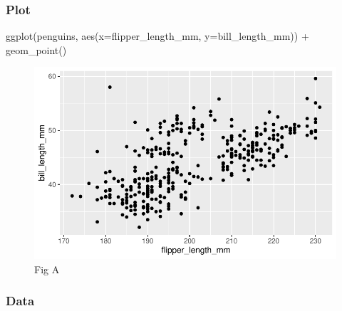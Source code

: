 \documentclass[
  letterpaper,
  DIV=11,
  numbers=noendperiod]{scrreprt}
\newenvironment{Shaded}{\begin{snugshade}}{\end{snugshade}}
\newcommand{\AttributeTok}[1]{\textcolor[rgb]{0.40,0.45,0.13}{#1}}
\newcommand{\FunctionTok}[1]{\textcolor[rgb]{0.28,0.35,0.67}{#1}}
\newcommand{\NormalTok}[1]{\textcolor[rgb]{0.00,0.23,0.31}{#1}}
\newcommand{\SpecialCharTok}[1]{\textcolor[rgb]{0.37,0.37,0.37}{#1}}
\begin{document}
\begin{tcolorbox}[enhanced jigsaw, breakable, colback=white, bottomrule=.15mm, leftrule=.75mm, colframe=quarto-callout-note-color-frame, arc=.35mm, rightrule=.15mm, toprule=.15mm, left=2mm, opacityback=0]

\hypertarget{plot}{%
\subsubsection*{Plot}\label{plot}}

\begin{Shaded}
\begin{Highlighting}[]
\FunctionTok{ggplot}\NormalTok{(penguins, }\FunctionTok{aes}\NormalTok{(}\AttributeTok{x=}\NormalTok{flipper\_length\_mm, }\AttributeTok{y=}\NormalTok{bill\_length\_mm)) }\SpecialCharTok{+}
  \FunctionTok{geom\_point}\NormalTok{()}
\end{Highlighting}
\end{Shaded}

\begin{figure}[H]

{\centering \includegraphics{03-content_files/figure-pdf/unnamed-chunk-4-1.pdf}

}

\caption{Fig A}

\end{figure}

\hypertarget{data}{%
\subsubsection*{Data}\label{data}}


\end{tcolorbox}
\end{document}

